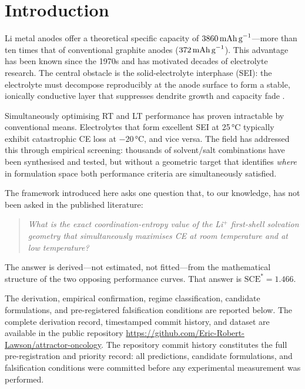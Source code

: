 \documentclass[11pt]{article}
\theoremstyle{plain}
\theoremstyle{definition}
\theoremstyle{remark}
\begin{document}
\section{Introduction}

Li metal anodes offer a theoretical specific capacity of
$3860\,\text{mAh\,g}^{-1}$---more than ten times that of conventional graphite
anodes ($372\,\text{mAh\,g}^{-1}$).  This advantage has been known since the
1970s and has motivated decades of electrolyte research.  The central obstacle is
the solid-electrolyte interphase (SEI): the electrolyte must decompose
reproducibly at the anode surface to form a stable, ionically conductive layer
that suppresses dendrite growth and capacity fade \cite{Aurbach2000, Tikekar2016}.

Simultaneously optimising RT and LT performance has proven intractable by
conventional means.  Electrolytes that form excellent SEI at 25\,°C typically
exhibit catastrophic CE loss at $-20$\,°C, and vice versa.  The field has
addressed this through empirical screening: thousands of
solvent/salt combinations have been synthesised and tested, but without a
geometric target that identifies \emph{where} in formulation space both performance
criteria are simultaneously satisfied.

The framework introduced here asks one question that, to our knowledge,
has not been asked in the published literature:

\begin{quote}
\itshape What is the exact coordination-entropy value of the Li$^{+}$ first-shell
solvation geometry that simultaneously maximises CE at room temperature and at low
temperature?
\end{quote}

The answer is derived---not estimated, not fitted---from the mathematical
structure of the two opposing performance curves.  That answer is
$\text{SCE}^{*} = 1.466$.

The derivation, empirical confirmation, regime classification, candidate
formulations, and pre-registered falsification conditions are reported below.
The complete derivation record, timestamped commit history, and dataset are
available in the public repository
\url{https://github.com/Eric-Robert-Lawson/attractor-oncology}.
The repository commit history constitutes the full pre-registration and priority
record: all predictions, candidate formulations, and falsification conditions
were committed before any experimental measurement was performed.

\end{document}
